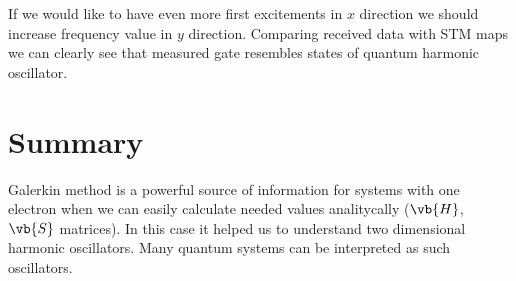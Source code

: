 \documentclass[a4paper, 12pt]{article}
\begin{document}
If we would like to have even more first excitements in $x$ direction we should increase frequency value in $y$ direction.
Comparing received data with STM maps we can clearly see that measured gate resembles states of quantum harmonic oscillator.

\section*{Summary}

Galerkin method is a powerful source of information for systems with one electron when we can easily calculate needed values analitycally ($\vb{H}$, $\vb{S}$ matrices).
In this case it helped us to understand two dimensional harmonic oscillators.
Many quantum systems can be interpreted as such oscillators.
\end{document}
